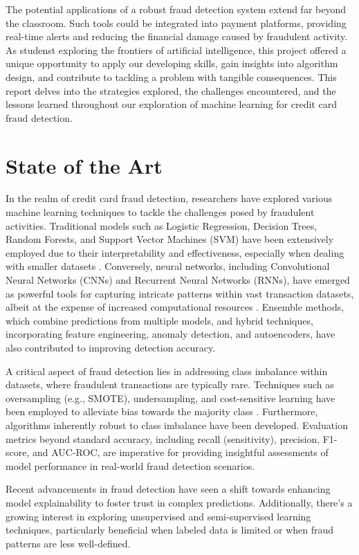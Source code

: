 \documentclass[conference]{IEEEtran}
\begin{document}
The potential applications of a robust fraud detection system extend far beyond the classroom. Such tools could be integrated into payment platforms, providing real-time alerts and reducing the financial damage caused by fraudulent activity. As studenst exploring the frontiers of artificial intelligence, this project offered a unique opportunity to apply our developing skills, gain insights into algorithm design, and contribute to tackling a problem with tangible consequences. This report delves into the strategies explored, the challenges encountered, and the lessons learned throughout our exploration of machine learning for credit card fraud detection.

\section{State of the Art}

In the realm of credit card fraud detection, researchers have explored various machine learning techniques to tackle the challenges posed by fraudulent activities. Traditional models such as Logistic Regression, Decision Trees, Random Forests, and Support Vector Machines (SVM) have been extensively employed due to their interpretability and effectiveness, especially when dealing with smaller datasets \cite{b4}. Conversely, neural networks, including Convolutional Neural Networks (CNNs) and Recurrent Neural Networks (RNNs), have emerged as powerful tools for capturing intricate patterns within vast transaction datasets, albeit at the expense of increased computational resources \cite{b14}. Ensemble methods, which combine predictions from multiple models, and hybrid techniques, incorporating feature engineering, anomaly detection, and autoencoders, have also contributed to improving detection accuracy.

A critical aspect of fraud detection lies in addressing class imbalance within datasets, where fraudulent transactions are typically rare. Techniques such as oversampling (e.g., SMOTE), undersampling, and cost-sensitive learning have been employed to alleviate bias towards the majority class \cite{b13}. Furthermore, algorithms inherently robust to class imbalance have been developed. Evaluation metrics beyond standard accuracy, including recall (sensitivity), precision, F1-score, and AUC-ROC, are imperative for providing insightful assessments of model performance in real-world fraud detection scenarios.

Recent advancements in fraud detection have seen a shift towards enhancing model explainability to foster trust in complex predictions. Additionally, there's a growing interest in exploring unsupervised and semi-supervised learning techniques, particularly beneficial when labeled data is limited or when fraud patterns are less well-defined.
\end{document}

